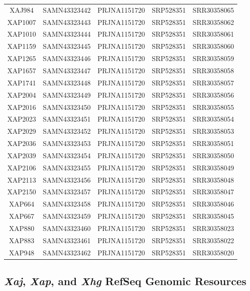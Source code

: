 \documentclass[
]{book}
\begin{document}
\begin{longtable}[]{@{}ccccc@{}}
XAJ984 & SAMN43323442 & PRJNA1151720 & SRP528351 & SRR30358065 \\
XAP1007 & SAMN43323443 & PRJNA1151720 & SRP528351 & SRR30358062 \\
XAP1010 & SAMN43323444 & PRJNA1151720 & SRP528351 & SRR30358061 \\
XAP1159 & SAMN43323445 & PRJNA1151720 & SRP528351 & SRR30358060 \\
XAP1265 & SAMN43323446 & PRJNA1151720 & SRP528351 & SRR30358059 \\
XAP1657 & SAMN43323447 & PRJNA1151720 & SRP528351 & SRR30358058 \\
XAP1741 & SAMN43323448 & PRJNA1151720 & SRP528351 & SRR30358057 \\
XAP2004 & SAMN43323449 & PRJNA1151720 & SRP528351 & SRR30358056 \\
XAP2016 & SAMN43323450 & PRJNA1151720 & SRP528351 & SRR30358055 \\
XAP2023 & SAMN43323451 & PRJNA1151720 & SRP528351 & SRR30358054 \\
XAP2029 & SAMN43323452 & PRJNA1151720 & SRP528351 & SRR30358053 \\
XAP2036 & SAMN43323453 & PRJNA1151720 & SRP528351 & SRR30358051 \\
XAP2039 & SAMN43323454 & PRJNA1151720 & SRP528351 & SRR30358050 \\
XAP2106 & SAMN43323455 & PRJNA1151720 & SRP528351 & SRR30358049 \\
XAP2113 & SAMN43323456 & PRJNA1151720 & SRP528351 & SRR30358048 \\
XAP2150 & SAMN43323457 & PRJNA1151720 & SRP528351 & SRR30358047 \\
XAP664 & SAMN43323458 & PRJNA1151720 & SRP528351 & SRR30358046 \\
XAP667 & SAMN43323459 & PRJNA1151720 & SRP528351 & SRR30358045 \\
XAP880 & SAMN43323460 & PRJNA1151720 & SRP528351 & SRR30358023 \\
XAP883 & SAMN43323461 & PRJNA1151720 & SRP528351 & SRR30358022 \\
XAP948 & SAMN43323462 & PRJNA1151720 & SRP528351 & SRR30358020 \\
\end{longtable}

\subsection{\texorpdfstring{\emph{Xaj}, \emph{Xap}, and \emph{Xhg} RefSeq Genomic Resources}{Xaj, Xap, and Xhg RefSeq Genomic Resources}}\label{xaj-xap-and-xhg-refseq-genomic-resources}
\end{document}
